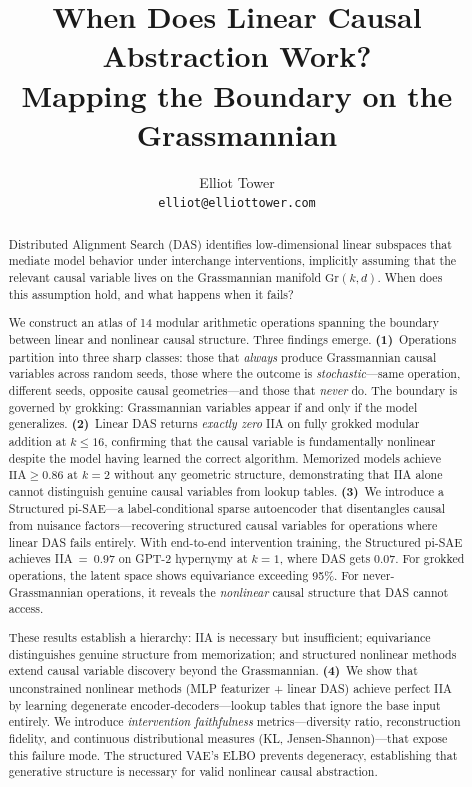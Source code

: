 \documentclass{article}
\title{When Does Linear Causal Abstraction Work?\\
Mapping the Boundary on the Grassmannian}
\author{
Elliot Tower \\
\texttt{elliot@elliottower.com}
}
\newcommand{\Gr}{\mathrm{Gr}}
\newcommand{\IIA}{\mathrm{IIA}}
\begin{document}
\maketitle

\begin{abstract}
Distributed Alignment Search (DAS) identifies low-dimensional linear subspaces
that mediate model behavior under interchange interventions, implicitly assuming
that the relevant causal variable lives on the Grassmannian manifold
$\Gr(k,d)$. When does this assumption hold, and what happens when it fails?

We construct an atlas of 14 modular arithmetic operations spanning the boundary
between linear and nonlinear causal structure. Three findings emerge.
\textbf{(1)}~Operations partition into three sharp classes: those that
\emph{always} produce Grassmannian causal variables across random seeds, those
where the outcome is \emph{stochastic}---same operation, different seeds,
opposite causal geometries---and those that \emph{never} do. The boundary is
governed by grokking: Grassmannian variables appear if and only if the model
generalizes. \textbf{(2)}~Linear DAS returns \emph{exactly zero} IIA on fully
grokked modular addition at $k \leq 16$, confirming that the causal variable is
fundamentally nonlinear despite the model having learned the correct algorithm.
Memorized models achieve $\IIA \geq 0.86$ at $k = 2$ without any geometric
structure, demonstrating that IIA alone cannot distinguish genuine causal
variables from lookup tables. \textbf{(3)}~We introduce a Structured pi-SAE---a label-conditional sparse
autoencoder that disentangles causal from nuisance factors---recovering
structured causal variables for operations where linear DAS fails entirely.
With end-to-end intervention training, the Structured pi-SAE achieves
IIA~=~0.97 on GPT-2 hypernymy at $k{=}1$, where DAS gets 0.07.
For grokked operations, the latent space shows equivariance exceeding 95\%.
For never-Grassmannian operations, it reveals the \emph{nonlinear} causal
structure that DAS cannot access.

These results establish a hierarchy: IIA is necessary but insufficient;
equivariance distinguishes genuine structure from memorization; and structured
nonlinear methods extend causal variable discovery beyond the Grassmannian.
\textbf{(4)}~We show that unconstrained nonlinear methods (MLP featurizer +
linear DAS) achieve perfect IIA by learning degenerate encoder-decoders---lookup
tables that ignore the base input entirely. We introduce \emph{intervention
faithfulness} metrics---diversity ratio, reconstruction fidelity, and continuous
distributional measures (KL, Jensen-Shannon)---that expose this failure mode.
The structured VAE's ELBO prevents degeneracy, establishing that generative
structure is necessary for valid nonlinear causal abstraction.
\end{abstract}
\end{document}
